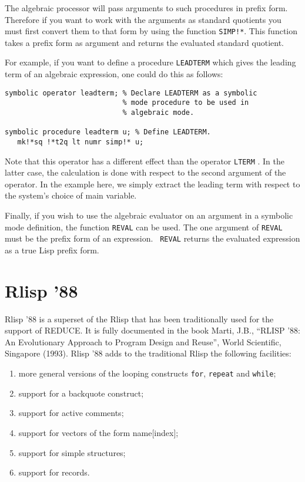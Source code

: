 The algebraic processor will pass arguments to such procedures in prefix
form. Therefore if you want to work with the arguments as standard
quotients you must first convert them to that form by using the function
{\tt SIMP!*}. This function takes a prefix form as argument and returns the
evaluated standard quotient.

For example, if you want to define a procedure {\tt LEADTERM} which gives the
leading term of an algebraic expression, one could do this as follows:
\begin{samepage}
\begin{verbatim}
symbolic operator leadterm; % Declare LEADTERM as a symbolic
                            % mode procedure to be used in
                            % algebraic mode.

symbolic procedure leadterm u; % Define LEADTERM.
   mk!*sq !*t2q lt numr simp!* u;
\end{verbatim}
\end{samepage}
Note that this operator has a different effect than the operator {\tt LTERM}
.  In the latter case, the calculation is done
with respect to the second argument of the operator.  In the example here,
we simply extract the leading term with respect to the system's choice of
main variable.

Finally, if you wish to use the algebraic evaluator on an argument in a
symbolic mode definition, the function {\tt REVAL} can be used.  The one
argument of {\tt REVAL} must be the prefix form of an expression. {\tt
REVAL} returns the evaluated expression as a true Lisp prefix form.

\section{Rlisp '88}

Rlisp '88 is a superset of the Rlisp that has been traditionally used for
the support of REDUCE.  It is fully documented in the book
Marti, J.B., ``{RLISP} '88:  An Evolutionary Approach to Program Design
and Reuse'', World Scientific, Singapore (1993).
Rlisp '88 adds to the traditional Rlisp the following facilities:
\begin{enumerate}
\item more general versions of the looping constructs {\tt for},
{\tt repeat} and {\tt while};

\item support for a backquote construct;

\item support for active comments;

\item support for vectors of the form name[index];

\item support for simple structures;

\item support for records.
\end{enumerate}


